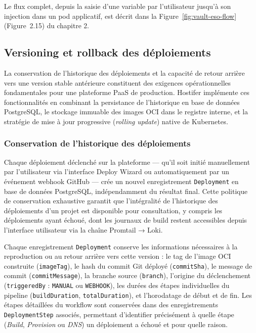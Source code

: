 Le flux complet, depuis la saisie d'une variable par l'utilisateur jusqu'à son injection dans un pod applicatif, est décrit dans la Figure~\ref{fig:vault-eso-flow} (Figure~2.15) du chapitre 2.

\subsection{Versioning et rollback des déploiements}

La conservation de l'historique des déploiements et la capacité de retour arrière vers une version stable antérieure constituent des exigences opérationnelles fondamentales pour une plateforme PaaS de production. Hostifer implémente ces fonctionnalités en combinant la persistance de l'historique en base de données PostgreSQL, le stockage immuable des images OCI dans le registre interne, et la stratégie de mise à jour progressive (\textit{rolling update}) native de Kubernetes.

\subsubsection*{Conservation de l'historique des déploiements}

Chaque déploiement déclenché sur la plateforme — qu'il soit initié manuellement par l'utilisateur via l'interface Deploy Wizard ou automatiquement par un événement webhook GitHub — crée un nouvel enregistrement \texttt{Deployment} en base de données PostgreSQL, indépendamment du résultat final. Cette politique de conservation exhaustive garantit que l'intégralité de l'historique des déploiements d'un projet est disponible pour consultation, y compris les déploiements ayant échoué, dont les journaux de build restent accessibles depuis l'interface utilisateur via la chaîne Promtail → Loki.

Chaque enregistrement \texttt{Deployment} conserve les informations nécessaires à la reproduction ou au retour arrière vers cette version : le tag de l'image OCI construite (\texttt{imageTag}), le hash du commit Git déployé (\texttt{commitSha}), le message de commit (\texttt{commitMessage}), la branche source (\texttt{branch}), l'origine du déclenchement (\texttt{triggeredBy} : \texttt{MANUAL} ou \texttt{WEBHOOK}), les durées des étapes individuelles du pipeline (\texttt{buildDuration}, \texttt{totalDuration}), et l'horodatage de début et de fin. Les étapes détaillées du workflow sont conservées dans des enregistrements \texttt{DeploymentStep} associés, permettant d'identifier précisément à quelle étape (\textit{Build}, \textit{Provision} ou \textit{DNS}) un déploiement a échoué et pour quelle raison.

